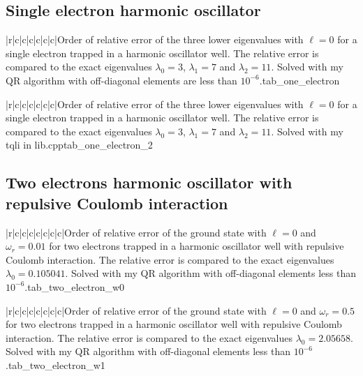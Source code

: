 \documentclass[11pt,english,a4paper]{article}
\begin{document}
\begin{flushleft}
\newpage
\subsection{Single electron harmonic oscillator}

\begin{tabell}{|r|c|c|c|c|c|c|}{\small}{}{}{Order of relative error of the three lower eigenvalues with $\ell = 0$ for a single electron trapped in a harmonic oscillator well. The relative error is compared to the exact eigenvalues  $\lambda_0 = 3$, $\lambda_1 = 7$ and $\lambda_2 = 11$. Solved with my QR algorithm with off-diagonal elements are less than $10^{-6}$.}{tab_one_electron}
\end{tabell}

\begin{tabell}{|r|c|c|c|c|c|c|}{\small}{}{}{Order of relative error of the three lower eigenvalues with $\ell = 0$ for a single electron trapped in a harmonic oscillator well. The relative error is compared to the exact eigenvalues  $\lambda_0 = 3$, $\lambda_1 = 7$ and $\lambda_2 = 11$. Solved with my tqli in lib.cpp}{tab_one_electron_2}
\end{tabell}

\subsection{Two electrons harmonic oscillator with repulsive Coulomb interaction}

\begin{tabell}{|r|c|c|c|c|c|c|c|}{\small}{}{}{Order of relative error of the ground state with $\ell = 0$ and $\omega_r = 0.01$ for two electrons trapped in a harmonic oscillator well with repulsive Coulomb interaction. The relative error is compared to the exact eigenvalues  $\lambda_0 = 0.105041$. Solved with my QR algorithm with off-diagonal elements less than $10^{-6}$.}{tab_two_electron_w0}
\end{tabell}

\begin{tabell}{|r|c|c|c|c|c|c|c|}{\small}{}{}{Order of relative error of the ground state with $\ell = 0$ and $\omega_r = 0.5$ for two electrons trapped in a harmonic oscillator well with repulsive Coulomb interaction. The relative error is compared to the exact eigenvalues  $\lambda_0 = 2.05658$. Solved with my QR algorithm with off-diagonal elements less than $10^{-6}$.}{tab_two_electron_w1}
\end{tabell}


\end{flushleft}
\end{document}
